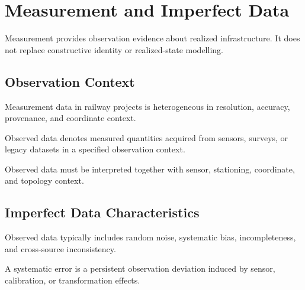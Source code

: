 
\chapter{Measurement and Imperfect Data}

\label{chap:measurement-and-imperfect-data}


Measurement provides observation evidence about realized infrastructure.
It does not replace constructive identity or realized-state modelling.

\section{Observation Context}

Measurement data in railway projects is heterogeneous in resolution,
accuracy, provenance, and coordinate context.

\begin{definition}
Observed data denotes measured quantities acquired from sensors, surveys,
or legacy datasets in a specified observation context.
\end{definition}

\begin{principle}
Observed data must be interpreted together with sensor, stationing,
coordinate, and topology context.
\end{principle}

\section{Imperfect Data Characteristics}

Observed data typically includes random noise, systematic bias,
incompleteness, and cross-source inconsistency.

\begin{definition}
A systematic error is a persistent observation deviation induced by
sensor, calibration, or transformation effects.
\end{definition}

